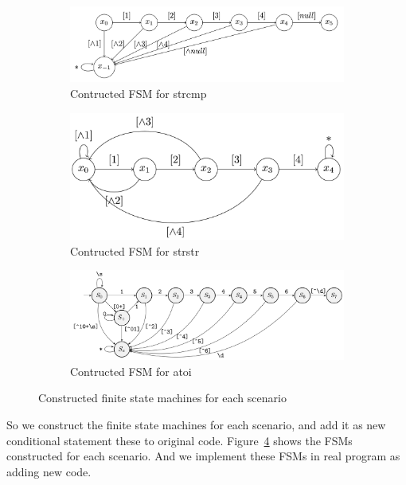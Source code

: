 \documentclass[12pt]{sigplanconf}
\begin{document}
\begin{figure}[h]
    \begin{subfigure}[t]{0.45\textwidth}
        \includegraphics[width=\textwidth]{figure/strcmp.png}
        \caption{Contructed FSM for strcmp}
        \label{fig:fsm-strcmp}
    \end{subfigure}
    \begin{subfigure}[t]{0.45\textwidth}
        \includegraphics[width=\textwidth]{figure/strstr.png}
        \caption{Contructed FSM for strstr}
        \label{fig:fsm-strstr}
    \end{subfigure}
    \begin{subfigure}[t]{0.45\textwidth}
        \includegraphics[width=\textwidth]{figure/atoi.png}
        \caption{Contructed FSM for atoi}
        \label{fig:fsm-atoi}
    \end{subfigure}
    \caption{Constructed finite state machines for each scenario}
    \label{fig:fsm} 
\end{figure}

So we construct the finite state machines for each scenario, and add it as new conditional statement these to original code.
Figure~\ref{fig:fsm} shows the FSMs constructed for each scenario. And we implement these FSMs in real program as adding
new code.
\end{document}
